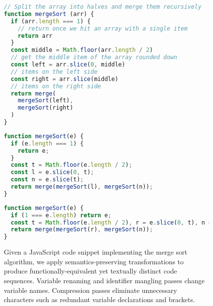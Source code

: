 \documentclass[11pt]{article}
\begin{document}
\begin{figure}[th!]
\centering
\begin{tcolorbox}[enhanced,size=small,colback=black!5!white,colframe=RoyalBlue,flip title={interior hidden},title={Original merge sort program}]
\begin{lstlisting}[language=JavaScript]
// Split the array into halves and merge them recursively
function mergeSort (arr) {
  if (arr.length === 1) {
    // return once we hit an array with a single item
    return arr
  }
  const middle = Math.floor(arr.length / 2)
  // get the middle item of the array rounded down
  const left = arr.slice(0, middle)
  // items on the left side
  const right = arr.slice(middle)
  // items on the right side
  return merge(
    mergeSort(left),
    mergeSort(right)
  )
}
\end{lstlisting}
\end{tcolorbox}
\vspace{2pt}

\begin{tcolorbox}[enhanced,size=small,colback=black!5!white,colframe=RoyalBlue,flip title={interior hidden},title={Variable renaming, comment removal, reformatting}]
\begin{tiny}
\begin{lstlisting}[language=JavaScript]
function mergeSort(e) {
  if (e.length === 1) {
    return e;
  }
  const t = Math.floor(e.length / 2);
  const l = e.slice(0, t);
  const n = e.slice(t);
  return merge(mergeSort(l), mergeSort(n));
}
\end{lstlisting}
\end{tiny}
\end{tcolorbox}
\vspace{2pt}

\begin{tcolorbox}[enhanced,size=small,colback=black!5!white,colframe=RoyalBlue,flip title={interior hidden},title={Combining variable declarations, inlining conditional}]
\begin{tiny}
\begin{lstlisting}[language=JavaScript]
function mergeSort(e) {
  if (1 === e.length) return e;
  const t = Math.floor(e.length / 2), r = e.slice(0, t), n = e.slice(t);
  return merge(mergeSort(r), mergeSort(n));
}
\end{lstlisting}
\end{tiny}
\end{tcolorbox}
\caption{Given a JavaScript code snippet implementing the merge sort algorithm, we apply semantics-preserving transformations to produce functionally-equivalent yet textually distinct code sequences. Variable renaming and identifier mangling passes change variable names. Compression passes eliminate unnecessary characters such as redundant variable declarations and brackets.}
\label{fig:merge_sort_example}
\end{figure} 
\end{document}
